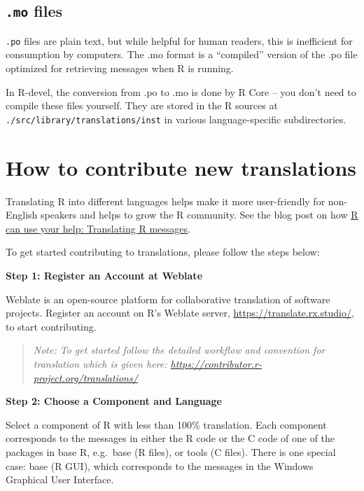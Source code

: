 \documentclass[
]{book}
\begin{document}
\subsection{\texorpdfstring{\texttt{.mo} files}{.mo files}}\label{mo-files}

\texttt{.po} files are plain text, but while helpful for human readers, this is
inefficient for consumption by computers. The .mo format is a ``compiled''
version of the .po file optimized for retrieving messages when R is
running.

In R-devel, the conversion from .po to .mo is done by R Core -- you
don't need to compile these files yourself. They are stored in the R
sources at \texttt{./src/library/translations/inst} in various
language-specific subdirectories.

\section{How to contribute new translations}\label{how-to-contribute-new-translations}

Translating R into different languages helps make it more user-friendly
for non-English speakers and helps to grow the R community. See the blog
post on how \href{https://blog.r-project.org/2022/07/25/r-can-use-your-help-translating-r-messages}{R can use your help: Translating R
messages}.

To get started contributing to translations, please follow the steps
below:

\textbf{Step 1: Register an Account at Weblate}

Weblate is an open-source platform for collaborative translation of
software projects. Register an account on R's Weblate server,
\url{https://translate.rx.studio/}, to start contributing.

\begin{quote}
\emph{Note: To get started follow the detailed workflow and convention for
translation which is given here:
\url{https://contributor.r-project.org/translations/}}
\end{quote}

\textbf{Step 2: Choose a Component and Language}

Select a component of R with less than 100\% translation. Each component
corresponds to the messages in either the R code or the C code of one of
the packages in base R, e.g.~base (R files), or tools (C files). There
is one special case: base (R GUI), which corresponds to the messages in
the Windows Graphical User Interface.
\end{document}
